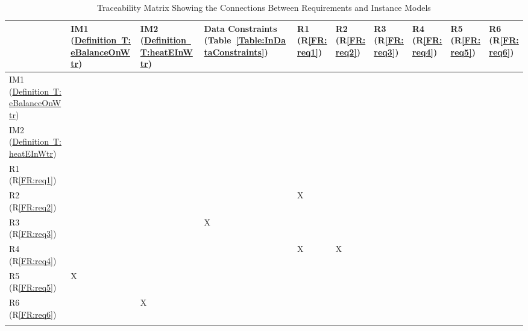 \documentclass[12pt]{article}
\begin{document}
\begin{longtable}{l l l l l l l l l l}
\toprule
 & IM1 (\hyperref[T:eBalanceOnWtr]{Definition~T:eBalanceOnWtr}) & IM2 (\hyperref[T:heatEInWtr]{Definition~T:heatEInWtr}) & Data Constraints (Table~\ref{Table:InDataConstraints}) & R1 (R\ref{FR:req1}) & R2 (R\ref{FR:req2}) & R3 (R\ref{FR:req3}) & R4 (R\ref{FR:req4}) & R5 (R\ref{FR:req5}) & R6 (R\ref{FR:req6})
\\
\midrule
IM1 (\hyperref[T:eBalanceOnWtr]{Definition~T:eBalanceOnWtr}) &  &  &  &  &  &  &  &  & 
\\
IM2 (\hyperref[T:heatEInWtr]{Definition~T:heatEInWtr}) &  &  &  &  &  &  &  &  & 
\\
R1 (R\ref{FR:req1}) &  &  &  &  &  &  &  &  & 
\\
R2 (R\ref{FR:req2}) &  &  &  & X &  &  &  &  & 
\\
R3 (R\ref{FR:req3}) &  &  & X &  &  &  &  &  & 
\\
R4 (R\ref{FR:req4}) &  &  &  & X & X &  &  &  & 
\\
R5 (R\ref{FR:req5}) & X &  &  &  &  &  &  &  & 
\\
R6 (R\ref{FR:req6}) &  & X &  &  &  &  &  &  & 
\\
\bottomrule
\caption{Traceability Matrix Showing the Connections Between Requirements and Instance Models}
\label{Table:TraceyRIs}
\end{longtable}
\end{document}

